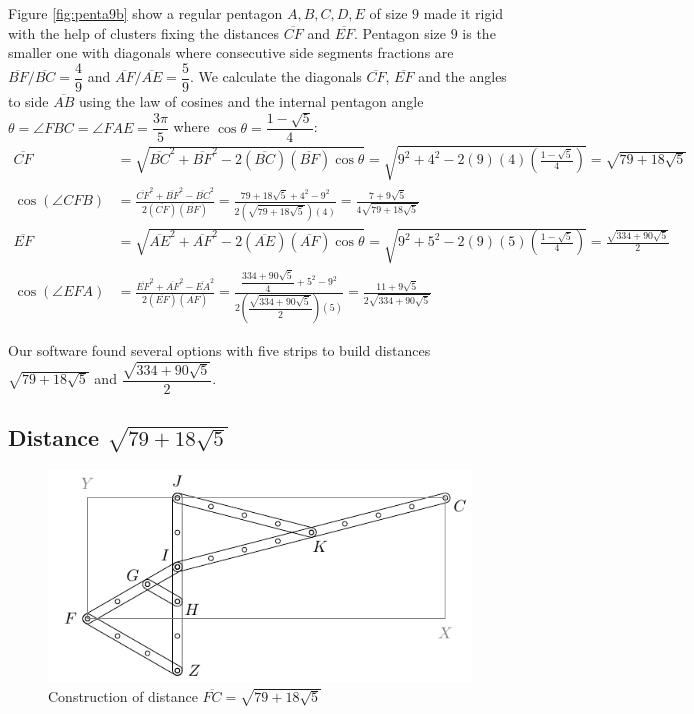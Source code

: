 \documentclass[11pt]{article}
\begin{document}
Figure \ref{fig:penta9b} show a regular pentagon $A,B,C,D,E$ of size $9$ made it rigid with the help of clusters fixing the distances $\overline{CF}$ and $\overline{EF}$. Pentagon size $9$ is the smaller one with diagonals where consecutive side segments fractions are $\overline{BF} / \overline{BC} =\dfrac{4}9$ and $\overline{AF} / \overline{AE} = \dfrac{5}9$. We calculate the diagonals $\overline{CF}$, $\overline{EF}$ and the angles to side $\overline{AB}$ using the law of cosines and the internal pentagon angle $\theta=\angle{FBC}=\angle{FAE}=\dfrac{3\pi}5$ where $\cos\theta = \dfrac{1-\sqrt5}4$:
\begin{align}
\overline{CF} &= \sqrt{
 \overline{BC}^2 + \overline{BF}^2 - 2(\overline{BC})(\overline{BF})\cos\theta } 
 = \sqrt{9^2 + 4^2 - 2(9)(4)\left(\frac{1-\sqrt5}4\right)} = \sqrt{79 + 18\sqrt5}\\
%
\cos(\angle{CFB}) &= 
 \frac{\overline{CF}^2 + \overline{BF}^2 - \overline{BC}^2}{2(\overline{CF})(\overline{BF})}
 = \frac{79 + 18\sqrt5 + 4^2 - 9^2}{2(\sqrt{79 + 18\sqrt5})(4)}
 = \frac{7 + 9\sqrt5}{4\sqrt{79 + 18\sqrt5}} \\
%
\overline{EF} &= \sqrt{
 \overline{AE}^2 + \overline{AF}^2 - 2(\overline{AE})(\overline{AF})\cos\theta} 
 = \sqrt{9^2 + 5^2 - 2(9)(5)\left(\frac{1-\sqrt5}4\right)} = \frac{\sqrt{334 + 90\sqrt5}}2\\
%
\cos(\angle{EFA}) &=
 \frac{\overline{EF}^2 + \overline{AF}^2 - \overline{EA}^2}{2(\overline{EF})(\overline{AF})}
 = \frac{\dfrac{334 + 90\sqrt5}4 + 5^2 - 9^2 }{2\left(\dfrac{\sqrt{334 + 90\sqrt5}}2\right)(5)}
 = \frac{11 + 9\sqrt5}{2\sqrt{334 + 90\sqrt5}}
\end{align}

Our software found several options with five strips to build distances $\sqrt{79 + 18\sqrt5}$
and $\dfrac{\sqrt{334 + 90\sqrt5}}2$.

\subsection{Distance $\sqrt{79 + 18\sqrt5}$}

\begin{figure}[H]
\centering
\includegraphics[scale=1]{9/cluster9b1}
\caption{Construction of distance $\overline{FC}=\sqrt{79 + 18\sqrt5}$}
\label{fig:cluster9b1}
\end{figure}
\end{document}
